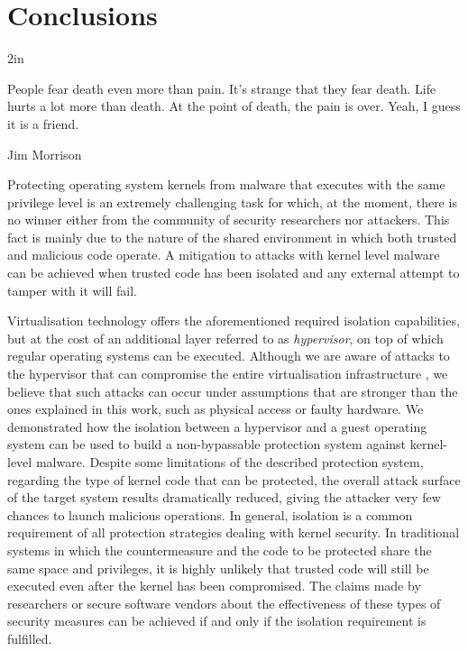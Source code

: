 \chapter{Conclusions} \label{conclusion}

\epigraph{2in}{People fear death even more than pain. It's strange that they fear death. Life hurts a lot more than death. At the point of death, the pain is over. Yeah, I guess it is a friend.}{Jim Morrison}{}



Protecting operating system kernels from malware that executes with the same privilege level is an extremely challenging task for which, at the moment, there is no winner either from the community of security researchers nor attackers. This fact is mainly due to the nature of the shared environment in which both trusted and malicious code operate.
A mitigation to attacks with kernel level malware can be achieved when trusted code has been isolated and any external attempt to tamper with it will fail. 

Virtualisation technology offers the aforementioned required isolation capabilities, but at the cost of an additional layer referred to as \emph{hypervisor}, on top of which regular operating systems can be executed. Although we are aware of attacks to the hypervisor that can compromise the entire virtualisation infrastructure \cite{hyperattack, Desnos:2011:DHR:1938158.1938205,Embleton:2008:SRN:1460877.1460892, Gebhardt:2008:HPH:2303959.2304226}, we believe that such attacks can occur under assumptions that are stronger than the ones explained in this work, such as physical access or faulty hardware. We demonstrated how the isolation between a hypervisor and a guest operating system can be used to build a non-bypassable protection system against kernel-level malware. Despite some limitations of the described protection system, regarding the type of kernel code that can be protected, the overall attack surface of the target system results dramatically reduced, giving the attacker very few chances to launch malicious operations. 
In general, isolation is a common requirement of all protection strategies dealing with kernel security. 
In traditional systems in which the countermeasure and the code to be protected share the same space and privileges, it is highly unlikely that trusted code will still be executed even after the kernel has been compromised. The claims made by researchers or secure software vendors about the effectiveness of these types of security measures can be achieved if and only if the isolation requirement is fulfilled.
 
